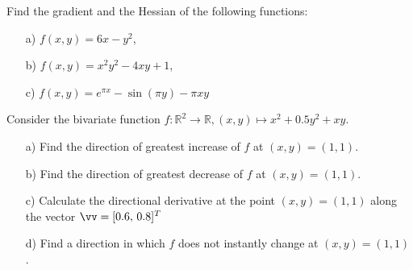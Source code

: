\bigskip

\begin{problem}
Find the gradient and the Hessian of the following functions: 
    \begin{enumerate}
    \item[a) ] $f(x,y) = 6x-y^2$,
    \item[b) ] $f(x,y) = x^2 y^2 - 4xy + 1$,
    \item[c) ] $f(x,y) = e^{\pi x} - \sin(\pi y) - \pi x y$
    \end{enumerate}
\end{problem}
\bigskip

\begin{problem}
Consider the bivariate function \( f : \mathbb{R}^2 \to \mathbb{R}, (x, y) \mapsto x^2 + 0.5y^2 + xy \).

\begin{enumerate}
    \item[a)] Find the direction of greatest increase of \( f \) at \( (x, y) = (1, 1) \).
    \item[b)] Find the direction of greatest decrease of \( f \) at \( (x, y) = (1, 1) \).
    \item[c) ] Calculate the directional derivative at the point \( (x, y) = (1, 1) \) along the vector $\vv=[0.6,\,0.8]^T$ 
    \item[d)] Find a direction in which \( f \) does not instantly change at \( (x, y) = (1, 1) \).
\end{enumerate}
\end{problem}


